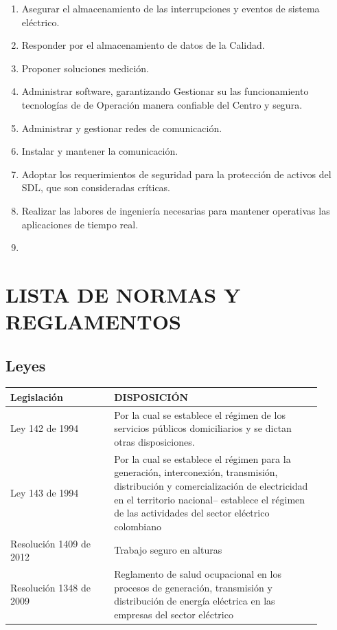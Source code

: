 \documentclass[a5paper]{book}%
\begin{document}
\begin{enumerate}
	\item Asegurar el almacenamiento de las interrupciones  y eventos  de sistema eléctrico.
	\item Responder  por el almacenamiento de datos de la Calidad.
	\item Proponer  soluciones medición.
	\item Administrar  software, garantizando Gestionar su las funcionamiento tecnologías de de Operación manera confiable del Centro  y segura.
	\item  Administrar y gestionar redes de comunicación.
	\item Instalar  y mantener  la comunicación.
	\item Adoptar los requerimientos de seguridad para la protección de activos del \ac{SDL},  que son consideradas críticas.
	\item Realizar las labores de ingeniería necesarias para mantener operativas las aplicaciones  de tiempo real.
	\item 
\end{enumerate}


    \chapter{LISTA DE NORMAS Y REGLAMENTOS}

\section{Leyes}

\begin{tabular}{|p{0.3\linewidth}|p{0.6\linewidth}|}
	\hline
	Legislación & DISPOSICIÓN \\\hline
	Ley 142 de 1994& Por la cual se establece el régimen de los servicios públicos domiciliarios y se dictan otras disposiciones.\\\hline
	Ley 143 de 1994& Por la cual se establece el régimen para la generación, interconexión, transmisión, distribución y comercialización de electricidad en el territorio nacional– establece el régimen de las actividades del sector eléctrico colombiano\\\hline
	Resolución 1409 de 2012  & Trabajo seguro en alturas \\\hline
	Resolución 1348 de 2009 & Reglamento de salud ocupacional
	en los procesos de generación, transmisión y distribución de
	energía eléctrica en las empresas del sector eléctrico \\\hline
\end{tabular}
\end{document}
